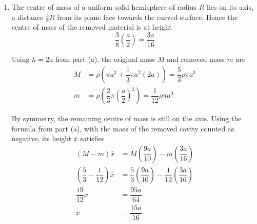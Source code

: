 \documentclass[leqno]{article}
\begin{document}
\begin{enumerate}[
  label=\textbf{\arabic*.},
  leftmargin=*,
  topsep=0pt,
  partopsep=0pt,
  parsep=0pt
]
\begin{djsSolution}
\begin{enumerate}[label=\textbf{(\alph*)}, start=1]
Measure heights along the axis from \(O\), and let the uniform density be \(\rho\). For a composite solid, the centre of mass satisfies
\[
M\bar{x}=\sum m_ix_i
\]

where \(M=\sum m_i\) is the total mass.
The centre of mass of a uniform solid cylinder lies halfway along its axis.
The centre of mass of a uniform solid cone of height \(H\) lies on its axis, a distance \(\frac14 H\) from its base towards its vertex.
Thus the component heights are \(\frac{a}{2}\) and \(a+\frac{h}{4}\), respectively.

The cylinder and cone have masses \(\rho\pi a^3\) and \(\frac13\rho\pi a^2h\). Using the given centre of mass and cancelling \(\rho\pi a^2\):
\begin{align*}
\dfrac{9a}{10}\left(a+\dfrac{h}{3}\right)
&=\dfrac{a^2}{2}+\dfrac{h}{3}\left(a+\dfrac{h}{4}\right)\\
54a^2+18ah&=30a^2+20ah+5h^2\\
5h^2+2ah-24a^2&=0\\
(h-2a)(5h+12a)&=0
\end{align*}

Since \(h>0\), the negative root is inadmissible, so
\[
h=2a
\]

\item The centre of mass of a uniform solid hemisphere of radius \(R\) lies on its axis, a distance \(\frac38 R\) from its plane face towards the curved surface.
Hence the centre of mass of the removed material is at height
\[
\dfrac38\left(\dfrac a2\right)=\dfrac{3a}{16}
\]

Using \(h=2a\) from part (a), the original mass \(M\) and removed mass \(m\) are
\begin{align*}
M&=\rho\left(\pi a^3+\dfrac13\pi a^2(2a)\right)
=\dfrac53\rho\pi a^3\\
m&=\rho\left(\dfrac23\pi\left(\dfrac a2\right)^3\right)
=\dfrac1{12}\rho\pi a^3
\end{align*}

By symmetry, the remaining centre of mass is still on the axis. Using the formula from part (a), with the mass of the removed cavity counted as negative, its height \(\bar{x}\) satisfies
\begin{align*}
(M-m)\bar{x}&=M\left(\dfrac{9a}{10}\right)-m\left(\dfrac{3a}{16}\right)\\
\left(\dfrac53-\dfrac1{12}\right)\bar{x}
&=\dfrac53\left(\dfrac{9a}{10}\right)-\dfrac1{12}\left(\dfrac{3a}{16}\right)\\
\dfrac{19}{12}\bar{x}&=\dfrac{95a}{64}\\
\bar{x}&=\dfrac{15a}{16}
\end{align*}


\end{enumerate}
\end{djsSolution}
\end{enumerate}
\end{document}
